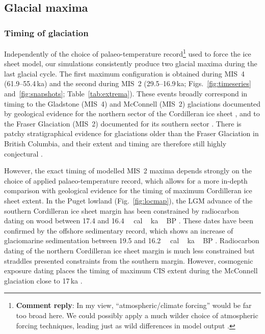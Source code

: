 \documentclass[tc, manuscript]{copernicus}
\newcommand{\renote}[1]{\footnote{\textbf{Comment reply}: #1}}
\begin{document}
\subsection{Glacial maxima}

\subsubsection{Timing of glaciation}
\label{sec:timing}

Independently of the choice of palaeo-temperature record\renote{
    In my view, ``atmospheric/climate forcing'' would be far too broad here. We
    could possibly apply a much wilder choice of atmospheric forcing
    techniques, leading just as wild differences in model output
    \citep[e.g.,][but possibly much more than that]{Seguinot.etal.2014}.}
used to force the ice sheet model, our simulations consistently produce two
glacial maxima during the last glacial cycle. The first maximum configuration
is obtained during MIS~4 (61.9--55.4\,ka) and the second during MIS~2
(29.5--16.9\,ka; Figs.~\ref{fig:timeseries} and~\ref{fig:snapshots};
Table~\ref{tab:extrema}). These events broadly correspond in timing to the
Gladstone
(MIS~4) and McConnell (MIS~2) glaciations documented by geological evidence for
the northern sector of the Cordilleran ice sheet
    \citep{Duk-Rodkin.etal.1996, Ward.etal.2007,
           Stroeven.etal.2010, Stroeven.etal.2014},
and to the Fraser Glaciation (MIS~2) documented for its southern sector
    \citep{Porter.Swanson.1998, Margold.etal.2014}.
There is patchy stratigraphical evidence for glaciations older than the Fraser
Glaciation \citep{Clague.Ward.2011} in British Columbia, and their extent and
timing are therefore still highly conjectural
    \citep[perhaps MIS~4 or early MIS~3; e.g.,][]{Cosma.etal.2008}.

However, the exact timing of modelled MIS~2 maxima depends strongly on the
choice of applied palaeo-temperature record, which allows for a more in-depth
comparison with geological evidence for the timing of maximum Cordilleran ice
sheet extent. In the Puget lowland (Fig.~\ref{fig:locmap}), the LGM advance of
the southern Cordilleran ice sheet margin has been constrained by radiocarbon
dating on wood between 17.4 and 16.4\,\unit{\,cal\,ka\,BP}
\citep{Porter.Swanson.1998}.
These dates have been confirmed by the offshore sedimentary record, which shows
an increase of glaciomarine sedimentation between 19.5 and
16.2\,\unit{\,cal\,ka\,BP} \citep{Cosma.etal.2008}. Radiocarbon
dating of the northern Cordilleran ice sheet margin is much less constrained
but straddles presented constraints from the southern margin. However,
cosmogenic exposure dating
places the timing of maximum CIS extent during the McConnell glaciation close
to 17\,ka \citep{Stroeven.etal.2010, Stroeven.etal.2014}.
\end{document}
